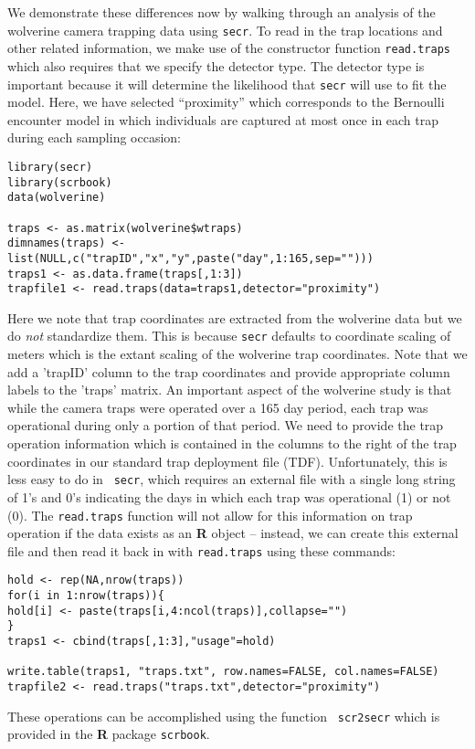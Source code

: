 We demonstrate these differences now by walking through an analysis of
the wolverine camera trapping data using \mbox{\tt secr}.  To read in
the trap locations and other related information, we make use of the
constructor function \mbox{\tt read.traps} which also requires that we
specify the detector type.  The detector type is important because it
will determine the likelihood that \mbox{\tt secr} will use to fit the
model.  Here, we have selected ``proximity'' which corresponds to the
Bernoulli encounter model in which individuals are captured at most
once in each trap during each sampling occasion: 
{\small
\begin{verbatim}
library(secr)
library(scrbook)
data(wolverine)

traps <- as.matrix(wolverine$wtraps)
dimnames(traps) <- list(NULL,c("trapID","x","y",paste("day",1:165,sep="")))
traps1 <- as.data.frame(traps[,1:3])
trapfile1 <- read.traps(data=traps1,detector="proximity")
\end{verbatim}
}
Here we note that trap coordinates are extracted from the wolverine
data but we do {\it not} standardize them. This is because
\mbox{\tt secr} defaults to coordinate scaling of meters which is the
extant scaling of the wolverine trap coordinates. Note that we add a 'trapID' column to
the trap coordinates and provide appropriate column labels to the
'traps' matrix. 
An important aspect of the
wolverine study is that while the camera traps were operated over a
165 day period, each trap was operational during only a portion of
that period. We need to provide the trap operation information which
is contained in the columns to the right of the trap coordinates in
our standard trap deployment file (TDF). Unfortunately, this is less easy to do in \mbox{\tt
  secr}, which requires an external file with a single long string of
1's and 0's indicating the days in which each trap was operational (1)
or not (0). The \mbox{\tt read.traps} function will not allow for this
 information on trap operation if the data exists as an {\bf R} object
 -- instead, we can create this external file and then read it back in
with \mbox{\tt read.traps} using these commands:
\begin{verbatim}
hold <- rep(NA,nrow(traps))
for(i in 1:nrow(traps)){
hold[i] <- paste(traps[i,4:ncol(traps)],collapse="")
}
traps1 <- cbind(traps[,1:3],"usage"=hold)

write.table(traps1, "traps.txt", row.names=FALSE, col.names=FALSE)
trapfile2 <- read.traps("traps.txt",detector="proximity") 
\end{verbatim}
These operations can be accomplished using the function \mbox{\tt
  scr2secr} which is provided in the {\bf R} package \mbox{\tt scrbook}.


